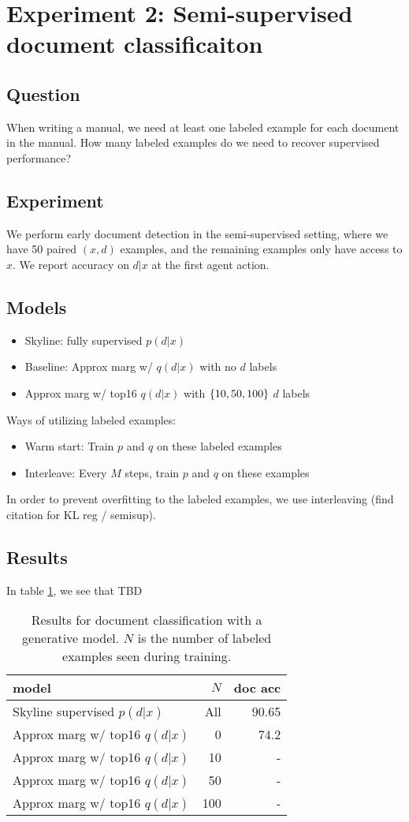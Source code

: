 \documentclass[11pt]{article}
\begin{document}
\section{Experiment 2: Semi-supervised document classificaiton}
\subsection{Question}
When writing a manual, we need at least one labeled example for each document in the manual.
How many labeled examples do we need to recover supervised performance?

\subsection{Experiment}
We perform early document detection in the semi-supervised setting,
where we have 50 paired $(x,d)$ examples, and the remaining examples only have access to $x$.
We report accuracy on $d|x$ at the first agent action.

\subsection{Models}
\begin{itemize}
\item Skyline: fully supervised $p(d|x)$
\item Baseline: Approx marg w/ $q(d|x)$ with no $d$ labels
\item Approx marg w/ top16 $q(d|x)$ with $\left\{10,50,100\right\}$ $d$ labels
\end{itemize}

Ways of utilizing labeled examples:
\begin{itemize}
\item Warm start: Train $p$ and $q$ on these labeled examples
\item Interleave: Every $M$ steps, train $p$ and $q$ on these examples
\end{itemize}
In order to prevent overfitting to the labeled examples, we use interleaving
(find citation for KL reg / semisup).

\subsection{Results}
In table \ref{tbl:semisup-doc}, we see that TBD

\begin{table}
\centering
\begin{tabular}{lrr}
\toprule
model & $N$ & doc acc\\
\midrule
Skyline supervised $p(d|x)$ & All & 90.65\\
Approx marg w/ top16 $q(d|x)$ & 0 & 74.2\\
Approx marg w/ top16 $q(d|x)$ & 10 & -\\
Approx marg w/ top16 $q(d|x)$ & 50 & -\\
Approx marg w/ top16 $q(d|x)$ & 100 & -\\
\bottomrule
\end{tabular}
\caption{
\label{tbl:semisup-doc}
Results for document classification with a generative model.
$N$ is the number of labeled examples seen during training.}
\end{table}
\end{document}
